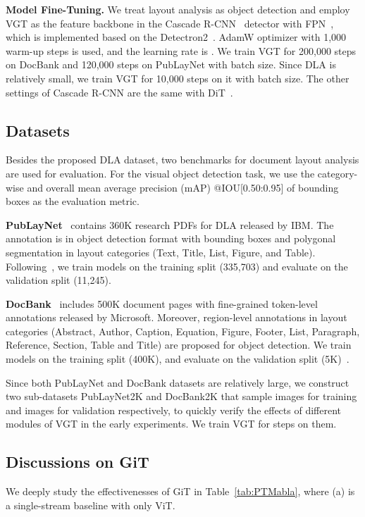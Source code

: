\documentclass[10pt,twocolumn,letterpaper]{article}
\begin{document}
\noindent
\textbf{Model Fine-Tuning.} 
We treat layout analysis as object detection
and employ VGT as the feature backbone in the Cascade R-CNN~\cite{cascade} detector with FPN~\cite{FPN},
which is implemented based on the Detectron2~\cite{Detectron2}.
AdamW optimizer with 1,000 warm-up steps is used, and the learning rate is .
We train VGT for 200,000 steps on DocBank and 120,000 steps on PubLayNet with  batch size.
Since DLA is relatively small, we train VGT for 10,000 steps on it with  batch size.
The other settings of Cascade R-CNN are the same with DiT~\cite{li2022dit}. 

\subsection{Datasets}
Besides the proposed DLA dataset, two benchmarks for document layout analysis are used for evaluation.
For the visual object detection task,
we use the category-wise and overall mean average precision (mAP) @IOU[0.50:0.95] of bounding boxes as the evaluation metric.

\noindent
\textbf{PubLayNet}~\cite{zhong2019publaynet} contains 360K research PDFs for DLA released by IBM.
The annotation is in object detection format with bounding boxes and polygonal segmentation in  layout categories (Text, Title, List, Figure, and Table). 
Following~\cite{gu2021unidoc,li2022dit,zhong2019publaynet}, we train models on the training split (335,703) and evaluate on the validation split (11,245).

\noindent
\textbf{DocBank}~\cite{li2020docbank} includes 500K document pages with fine-grained token-level
annotations released by Microsoft.
Moreover, region-level annotations in  layout categories (Abstract, Author, Caption, Equation, Figure, Footer,
List, Paragraph, Reference, Section, Table and Title) are proposed for object detection.
We train models on the training split (400K), and evaluate on the validation split (5K)~\cite{li2020docbank}.


Since both PubLayNet and DocBank datasets are relatively large, 
we construct two sub-datasets PubLayNet2K and DocBank2K 
that sample  images for training and  images for validation respectively, 
to quickly verify the effects of different modules of VGT in the early experiments. 
We train VGT for  steps on them.

\subsection{Discussions on GiT}
We deeply study the effectivenesses of GiT in Table~\ref{tab:PTMabla}, 
where (a) is a single-stream baseline with only ViT.
\end{document}
